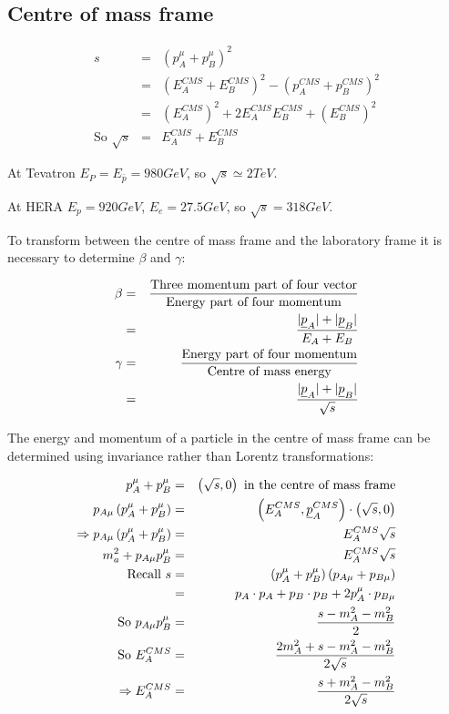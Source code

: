 \subsection{Centre of mass frame}

\begin{eqnarray*}
  s & = & \left(p^{\mu}_A + p^{\mu}_B \right)^2 \\
    & = & \left(E^{CMS}_A + E^{CMS}_B\right)^2 - \left(p^{CMS}_A + p^{CMS}_B\right)^2 \\
    & = & \left(E^{CMS}_A\right)^2 + 2E^{CMS}_AE^{CMS}_B + \left(E^{CMS}_B\right)^2 \\
  \textrm{So } \sqrt{s} & = & E^{CMS}_A + E^{CMS}_B
\end{eqnarray*}

At Tevatron $E_P = E_{\bar{p}} = 980 GeV$, so $\sqrt{s} \simeq 2TeV$.

At HERA $E_p = 920GeV$, $E_e = 27.5GeV$, so $\sqrt{s} = 318GeV$.

To transform between the centre of mass frame and the laboratory frame it is necessary to determine $\beta$ and $\gamma$:

\begin{eqnarray*}
  \beta & = & \frac{\textrm{Three momentum part of four vector}}{\textrm{Energy part of four momentum}} \\
  & = & \frac{|\underline{p}_A| + |\underline{p}_B|}{E_A + E_B} \\
  \gamma & = & \frac{\textrm{Energy part of four momentum}}{\textrm{Centre of mass energy}} \\
  & = & \frac{|\underline{p}_A| + |\underline{p}_B|}{\sqrt{s}}
\end{eqnarray*}

The energy and momentum of a particle in the centre of mass frame can be determined using invariance rather than Lorentz transformations:

\begin{eqnarray*}
  p^{\mu}_A + p^{\mu}_B & = & \left(\sqrt{s},0\right) \textrm{ in the centre of mass frame} \\
  p_{A\mu}\left(p^{\mu}_A + p^{\mu}_B \right) & = & \left(E^{CMS}_A,\underline{p}^{CMS}_A\right) \cdot \left(\sqrt{s},0\right) \\
  \Rightarrow p_{A\mu} \left(p^{\mu}_A + p^{\mu}_B\right) & = & E^{CMS}_A \sqrt{s} \\
  m^2_a + p_{A\mu}p^{\mu}_B & = & E^{CMS}_A \sqrt{s} \\
  \textrm{Recall } s & = & \left( p^{\mu}_A + p^{\mu}_B\right)\left(p_{A\mu} + p_{B\mu}\right) \\
  & = & p_A \cdot p_A + p_B \cdot p_B + 2p^{\mu}_A\cdot p_{B\mu} \\
  \textrm{So } p_{A\mu}p^{\mu}_B & = & \frac{s - m^2_A - m^2_B}{2} \\
  \textrm{So } E^{CMS}_A & = & \frac{2m^2_A + s - m^2_A - m^2_B}{2\sqrt{s}} \\
  \Rightarrow E^{CMS}_A & = & \frac{s + m^2_A - m^2_B}{2\sqrt{s}}
\end{eqnarray*}

